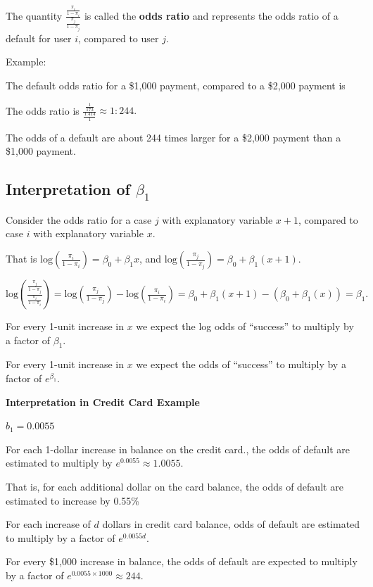 \documentclass[
  letterpaper,
  DIV=11,
  numbers=noendperiod]{scrreprt}
\begin{document}
The quantity \(\frac{\frac{\pi_i}{1-\pi_i}}{\frac{\pi_j}{1-\pi_j}}\) is
called the \textbf{odds ratio} and represents the odds ratio of a
default for user \(i\), compared to user \(j\).

Example:

The default odds ratio for a \$1,000 payment, compared to a \$2,000
payment is

The odds ratio is
\(\frac{\frac{1}{173}}{\frac{1.414}{1}}\approx 1:244.\)

The odds of a default are about 244 times larger for a \$2,000 payment
than a \$1,000 payment.

\subsection{\texorpdfstring{Interpretation of
\(\beta_1\)}{Interpretation of \textbackslash beta\_1}}\label{interpretation-of-beta_1}

Consider the odds ratio for a case \(j\) with explanatory variable
\(x + 1\), compared to case \(i\) with explanatory variable \(x\).

That is
\(\text{log}\left(\frac{\pi_i}{1-\pi_i}\right) = \beta_0+\beta_1x\), and
\(\text{log}\left(\frac{\pi_j}{1-\pi_j}\right) = \beta_0+\beta_1(x+1)\).

\(\text{log}\left(\frac{\frac{\pi_j}{1-\pi_j}}{\frac{\pi_i}{1-\pi_i}}\right)=\text{log}\left(\frac{\pi_j}{1-\pi_j}\right)-\text{log}\left(\frac{\pi_i}{1-\pi_i}\right)=\beta_0+\beta_1(x+1)-(\beta_0+\beta_1(x))=\beta_1.\)

For every 1-unit increase in \(x\) we expect the log odds of ``success''
to multiply by a factor of \(\beta_1\).

For every 1-unit increase in \(x\) we expect the odds of ``success'' to
multiply by a factor of \(e^{\beta_1}\).

\textbf{Interpretation in Credit Card Example}

\(b_1=0.0055\)

For each 1-dollar increase in balance on the credit card., the odds of
default are estimated to multiply by \(e^{0.0055}\approx1.0055\).

That is, for each additional dollar on the card balance, the odds of
default are estimated to increase by 0.55\%

For each increase of \(d\) dollars in credit card balance, odds of
default are estimated to multiply by a factor of \(e^{0.0055d}\).

For every \$1,000 increase in balance, the odds of default are expected
to multiply by a factor of \(e^{0.0055\times 1000}\approx 244\).
\end{document}
